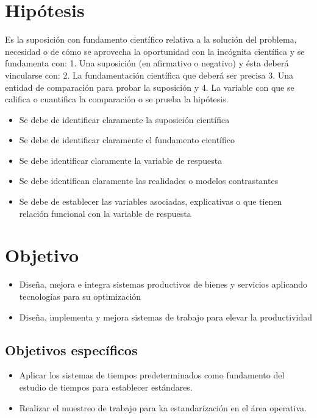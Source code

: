     \section{Hipótesis}
    
    Es la suposición con fundamento científico relativa a la solución del problema, necesidad o de cómo se aprovecha la oportunidad con la incógnita científica y se fundamenta con: 1. Una suposición (en afirmativo o negativo) y ésta deberá vincularse con:
    2. La fundamentación científica que deberá ser precisa 3. Una entidad de comparación para probar la suposición y
    4. La variable con que se califica o cuantifica la comparación o se prueba la hipótesis.
    
    \begin{itemize}
        \item Se debe de identificar claramente la suposición científica
        \item Se debe de identificar claramente el fundamento científico
        \item Se debe identificar claramente la variable de respuesta
        \item Se debe identifican claramente las realidades o modelos contrastantes
        \item Se debe de establecer las variables asociadas, explicativas o que tienen relación funcional con la variable de respuesta
    \end{itemize}
    \section{Objetivo}
    
    \begin{itemize}
        \item Diseña, mejora e integra sistemas productivos de bienes y servicios aplicando tecnologías para su optimización
        \item Diseña, implementa y mejora sistemas de trabajo para elevar la productividad
    \end{itemize}
    
    \subsection{Objetivos específicos }
    
    \begin{itemize}
        \item Aplicar los sistemas de tiempos predeterminados como fundamento del estudio de tiempos para establecer estándares.
        \item Realizar el muestreo de trabajo para ka estandarización en el área operativa.
        
    \end{itemize}
    
